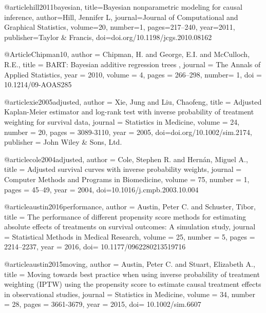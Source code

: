 @article{hill2011bayesian,
  title={Bayesian nonparametric modeling for causal inference},
  author={Hill, Jennifer L},
  journal={Journal of Computational and Graphical Statistics},
  volume={20},
  number={1},
  pages={217--240},
  year={2011},
  publisher={Taylor \& Francis},
  doi={doi.org/10.1198/jcgs.2010.08162}
}





@Article{Chipman10,
   author =   {Chipman, H. and George, E.I.   and McCulloch, R.E.},
   title =    {BART: Bayesian additive regression trees },
   journal =  {The Annals of Applied Statistics},
   year =    {2010},
   volume =   {4},
   pages =   {266--298},
   number= {1},
   doi = {10.1214/09-AOAS285}
 }






@article{xie2005adjusted,
  author = {Xie, Jung and Liu, Chaofeng},
  title = {Adjusted Kaplan-Meier estimator and log-rank test with inverse probability of treatment weighting for survival data},
  journal = {Statistics in Medicine},
  volume = {24},
  number = {20},
  pages = {3089-3110},
  year = {2005},
  doi={doi.org/10.1002/sim.2174},
  publisher = {John Wiley & Sons, Ltd.}
}





@article{cole2004adjusted,
  author = {Cole, Stephen R. and Hernán, Miguel A.},
  title = {Adjusted survival curves with inverse probability weights},
  journal = {Computer Methods and Programs in Biomedicine},
  volume = {75},
  number = {1},
  pages = {45--49},
  year = {2004},
  doi={10.1016/j.cmpb.2003.10.004}
}






@article{austin2016performance,
  author = {Austin, Peter C. and Schuster, Tibor},
  title = {The performance of different propensity score methods for estimating absolute effects of treatments on survival outcomes: A simulation study},
  journal = {Statistical Methods in Medical Research},
  volume = {25},
  number = {5},
  pages = {2214--2237},
  year = {2016},
  doi= {10.1177/0962280213519716}
}





@article{austin2015moving,
  author = {Austin, Peter C. and Stuart, Elizabeth A.},
  title = {Moving towards best practice when using inverse probability of treatment weighting (IPTW) using the propensity score to estimate causal treatment effects in observational studies},
  journal = {Statistics in Medicine},
  volume = {34},
  number = {28},
  pages = {3661-3679},
  year = {2015},
  doi= {10.1002/sim.6607}
}





